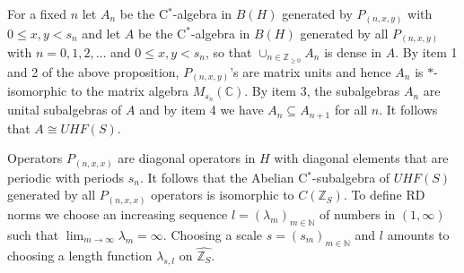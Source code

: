 \documentclass[12pt,reqno]{amsart}
\numberwithin{equation}{section}
\newcommand{\C}{{\mathbb C}}
\newcommand{\N}{{\mathbb N}}
\newcommand{\Z}{{\mathbb Z}}
\begin{document}
For a fixed $n$ let $A_n$ be the C$^*$-algebra in $B(H)$ generated by $P_{(n,x,y)}$ with $0\leq x,y<s_n$ and let $A$ be the C$^*$-algebra in $B(H)$ generated by all $P_{(n,x,y)}$ with $n=0,1,2, \ldots$ and $0\leq x,y<s_n$, so that $\cup_{n\in\Z_{\geq0}}A_n$ is dense in $A$. By item 1 and 2 of the above proposition, $P_{(n,x,y)}$'s are matrix units and hence $A_n$ is $*$-isomorphic to the matrix algebra $M_{s_n} (\C)$. By item 3, the subalgebras $A_n$ are unital subalgebras of $A$ and by item 4 we have $A_n\subseteq A_{n+1}$ for all $n$. It follows that $A\cong UHF(S)$.

Operators $P_{(n,x,x)}$ are diagonal operators in $H$ with diagonal elements that are periodic with periods $s_n$. It follows 
that the Abelian C$^*$-subalgebra of $UHF(S)$ generated by all $P_{(n,x,x)}$ operators is isomorphic to $C(\Z_S)$.
To define RD norms we choose an increasing sequence $l = (\lambda_m)_{m\in\N}$ of numbers in $(1,\infty)$ such that $\lim_{m\to\infty}\lambda_m=\infty$. Choosing a scale  $s = (s_m)_{m\in\N}$ and $l$ amounts to choosing a length function $\lambda_{s,l}$ on $\widehat{\Z_S}$.
\end{document}
